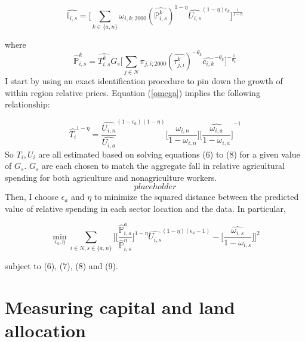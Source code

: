 \documentclass[]{article}
\begin{document}
\begin{equation}
\hat{\mathbb{I}_{i, s}} = \bigg[\sum_{k \in \{a, n\}} \omega_{i, k; 2000}(\hat{\mathbb{P}_{i, s}^{k}})^{1-\eta}\hat{U_{i, s}}^{(1-\eta)\epsilon_{k}} \bigg]^{\frac{1}{1-\eta}}
\end{equation}

where 
\begin{equation}
	\hat{\mathbb{P}}_{i, s}^{k} = \hat{T_{i, s}^{k}}G_{s}\bigg[\sum_{j \in N}\pi_{j, i; 2000}(\hat{\tau_{j, i}^{k}})^{-\theta_{k}}\hat{c_{i, k}}^{-\theta_{k}}\bigg]^{-\frac{1}{\theta_{k}}}
\end{equation}
I start by using an exact identification procedure to pin down the growth of within region relative prices. Equation (\ref{omega}) implies the following relationship:

\begin{equation}
	\hat{T_{i}}^{1-\eta} = \frac{\hat{U_{i, n}}}{\hat{U_{i, a}}}^{(1-\epsilon_{a})(1-\eta)}\hat{\big[\frac{\omega_{i, n}}{1-\omega_{i, n}}\big]}\hat{\big[\frac{\omega_{i, a}}{1-\omega_{i, a}}\big]}^{-1}
\end{equation}
So $T_{i}, U_{i}$ are all estimated based on solving equations (6) to (8) for a given value of $G_{s}$. $G_{s}$ are each chosen to match the aggregate fall in relative agricultural spending for both agriculture and nonagriculture workers. 
\begin{equation}
placeholder
\end{equation} 
Then, I choose $\epsilon_{a}$ and $\eta$ to minimize the squared distance between the predicted value of relative spending in each sector location and the data. In particular,

\begin{equation}
\min_{\epsilon_{a}, \eta}\sum_{i \in N, s \in \{a, n\}}\bigg[\big[\frac{\hat{\mathbb{P}}_{i, s}^{a}}{\hat{\mathbb{P}}_{i, s}^{n}}\big]^{1-\eta}\hat{U_{i, s}}^{(1-\eta)(\epsilon_{a}-1)} - \hat{\big[\frac{\omega_{i, s}}{1-\omega_{i, s}}\big]} \bigg]^{2}
\end{equation}

subject to (6), (7), (8) and (9). 

\section{Measuring capital and land allocation}
\end{document}
